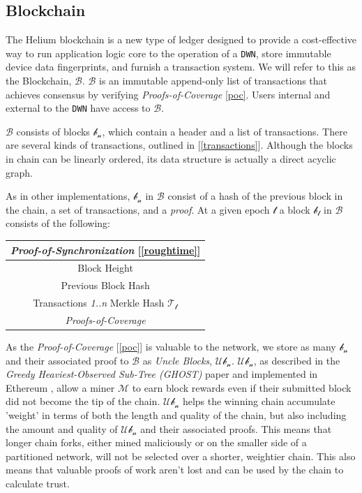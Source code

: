 \documentclass[letterpaper,11pt]{article}
\begin{document}
\subsection{Blockchain}

The Helium blockchain is a new type of ledger designed to provide a cost-effective way to run application logic core to the operation of a \verb|DWN|, store immutable device data fingerprints, and furnish a transaction system. We will refer to this as the Blockchain, $\mathcal{B}$. $\mathcal{B}$ is an immutable append-only list of transactions that achieves consensus by verifying \textit{Proofs-of-Coverage} \ref{poc}. Users internal and external to the \verb|DWN| have access to $\mathcal{B}$.\newline

$\mathcal{B}$ consists of blocks $\mathcal{b_n}$, which contain a header and a list of transactions. There are several kinds of transactions, outlined in [\ref{transactions}]. Although the blocks in chain can be linearly ordered, its data structure is actually a direct acyclic graph.\newline

As in other implementations, $\mathcal{b_n}$ in $\mathcal{B}$ consist of a hash of the previous block in the chain, a set of transactions, and a \textit{proof}. At a given epoch $\mathcal{t}$ a block $\mathcal{b_t}$ in $\mathcal{B}$ consists of the following:

\begin{center}
	\begin{tabular}{|c|}
		\hline
		 \textit{Proof-of-Synchronization} [\ref{roughtime}]\\
		 \hline
		 Block Height \\
		\hline
		 Previous Block Hash \\
		 \hline
		 Transactions \textit{1..n} Merkle Hash $\mathcal{T_t}$ \\
		 \hline
		 \textit{Proofs-of-Coverage} \\
		 \hline
	\end{tabular}
\end{center}

As the \textit{Proof-of-Coverage} [\ref{poc}] is valuable to the network, we store as many $\mathcal{b_n}$ and their associated proof to $\mathcal{B}$ as \textit{Uncle Blocks}, $\mathcal{Ub_n}$. $\mathcal{Ub_n}$, as described in the \textit{Greedy Heaviest-Observed Sub-Tree (GHOST)} \cite{ghost} paper and implemented in Ethereum \cite{ethereum}, allow a miner $\mathcal{M}$ to earn block rewards even if their submitted block did not become the tip of the chain. $\mathcal{Ub_n}$ helps the winning chain accumulate 'weight' in terms of both the length and quality of the chain, but also including the amount and quality of $\mathcal{Ub_n}$ and their associated proofs. This means that longer chain forks, either mined maliciously or on the smaller side of a partitioned network, will not be selected over a shorter, weightier chain. This also means that valuable proofs of work aren't lost and can be used by the chain to calculate trust.\newline
\end{document}
